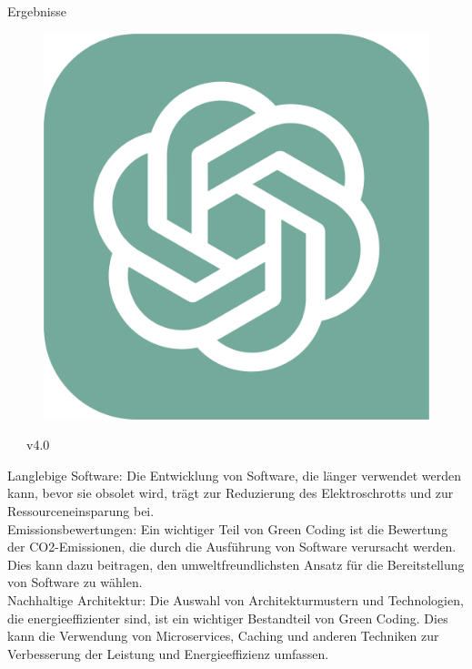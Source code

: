 \documentclass[10pt,aspectratio=169]{beamer}
\begin{document}
\begin{frame}{Ergebnisse}
     \begin{minipage}{0.05\linewidth}
        \scriptsize
        \begin{figure}[!ht]
            \includegraphics[width=\linewidth]{assets/ChatGPT_logo.pdf}
        \end{figure}
        \vspace{-2mm}
        ~~~v4.0
        \vspace{4.8cm}
    \end{minipage}
    \begin{minipage}{0.94\linewidth}
    \begin{framed}
        \footnotesize
        Langlebige Software: Die Entwicklung von Software, die länger verwendet werden kann, bevor sie obsolet wird, trägt zur Reduzierung des Elektroschrotts und zur Ressourceneinsparung bei.\\[2mm]        
        Emissionsbewertungen: Ein wichtiger Teil von Green Coding ist die Bewertung der CO2-Emissionen, die durch die Ausführung von Software verursacht werden. Dies kann dazu beitragen, den umweltfreundlichsten Ansatz für die Bereitstellung von Software zu wählen.\\[2mm]
        Nachhaltige Architektur: Die Auswahl von Architekturmustern und Technologien, die energieeffizienter sind, ist ein wichtiger Bestandteil von Green Coding. Dies kann die Verwendung von Microservices, Caching und anderen Techniken zur Verbesserung der Leistung und Energieeffizienz umfassen.\\[2mm]

\end{framed}
\end{minipage}
\end{frame}
\end{document}
